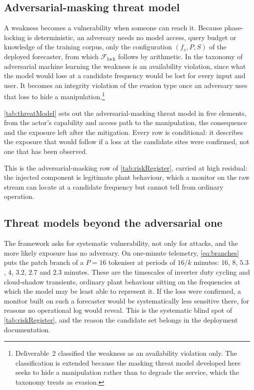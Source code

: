 

\subsection{Adversarial-masking threat model}
A weakness becomes a vulnerability when someone can reach it. Because phase-locking is deterministic, an adversary needs no model access, query budget or knowledge of the training corpus, only the configuration $(f_s,P,S)$ of the deployed forecaster, from which $\mathcal F_{\mathrm{lock}}$ follows by arithmetic. In the taxonomy of adversarial machine learning\autocite{vassilevAdversarialMachineLearning2024} the weakness is an availability violation, since what the model would lose at a candidate frequency would be lost for every input and user. It becomes an integrity violation of the evasion type once an adversary uses that loss to hide a manipulation.\footnote{Deliverable~2 classified the weakness as an availability violation only. The classification is extended because the masking threat model developed here seeks to hide a manipulation rather than to degrade the service, which the taxonomy treats as evasion.}

\autoref{tab:threatModel} sets out the adversarial-masking threat model in five elements, from the actor's capability and access path to the manipulation, the consequence and the exposure left after the mitigation. Every row is conditional: it describes the exposure that would follow if a loss at the candidate sites were confirmed, not one that has been observed.



This is the adversarial-masking row of \autoref{tab:riskRegister}, carried at high residual: the injected component is legitimate plant behaviour, which a monitor on the raw stream can locate at a candidate frequency but cannot tell from ordinary operation.

\subsection{Threat models beyond the adversarial one}

The framework asks for systematic vulnerability, not only for attacks, and the more likely exposure has no adversary. On one-minute telemetry, \autoref{eq:branches} puts the patch branch of a $P{=}16$ tokeniser at periods of $16/k$ minutes: $16$, $8$, $5.3$, $4$, $3.2$, $2.7$ and $2.3$ minutes. These are the timescales of inverter duty cycling and cloud-shadow transients, ordinary plant behaviour sitting on the frequencies at which the model may be least able to represent it. If the loss were confirmed, a monitor built on such a forecaster would be systematically less sensitive there, for reasons no operational log would reveal. This is the systematic blind spot of \autoref{tab:riskRegister}, and the reason the candidate set belongs in the deployment documentation.

